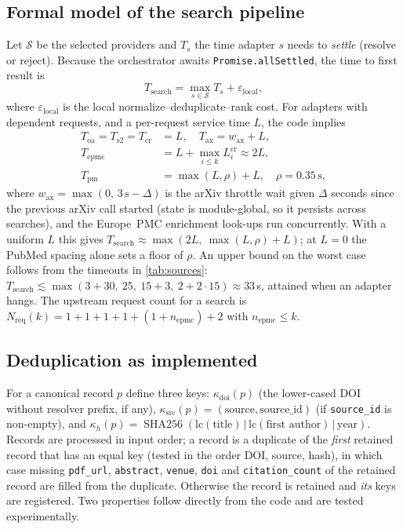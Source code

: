 \documentclass[conference]{IEEEtran}
\newcommand{\code}[1]{\texttt{\small #1}}
\begin{document}
\subsection{Formal model of the search pipeline}
Let $\mathcal S$ be the selected providers and $T_s$ the time adapter $s$ needs to \emph{settle} (resolve or reject). Because the orchestrator awaits \code{Promise.allSettled}, the time to first result is
\begin{equation}
T_{\text{search}} = \max_{s\in\mathcal S} T_s + \varepsilon_{\text{local}},
\label{eq:tsearch}
\end{equation}
where $\varepsilon_{\text{local}}$ is the local normalize--deduplicate--rank cost. For adapters with dependent requests, and a per-request service time $L$, the code implies
\begin{align}
T_{\text{oa}} = T_{\text{s2}} = T_{\text{cr}} &= L, \quad T_{\text{ax}} = w_{\text{ax}} + L, \nonumber\\
T_{\text{epmc}} &= L + \max_{i\le k} L^{\text{cr}}_i \approx 2L, \nonumber\\
T_{\text{pm}} &= \max(L,\rho) + L, \quad \rho = 0.35\,\text{s},
\label{eq:adapters}
\end{align}
where $w_{\text{ax}}=\max(0,\,3\,\text{s}-\Delta)$ is the arXiv throttle wait given $\Delta$ seconds since the previous arXiv call started (state is module-global, so it persists across searches), and the Europe~PMC enrichment look-ups run concurrently. With a uniform $L$ this gives $T_{\text{search}} \approx \max(2L,\ \max(L,\rho)+L)$; at $L{=}0$ the PubMed spacing alone sets a floor of $\rho$. An upper bound on the worst case follows from the timeouts in \cref{tab:sources}: $T_{\text{search}} \lesssim \max(3{+}30,\ 25,\ 15{+}3,\ 2{+}2{\cdot}15)\approx 33$\,s, attained when an adapter hangs. The upstream request count for a search is $N_{\text{req}}(k) = 1{+}1{+}1{+}1{+}(1{+}n_{\text{epmc}}){+}2$ with $n_{\text{epmc}}\le k$.

\subsection{Deduplication as implemented}
For a canonical record $p$ define three keys: $\kappa_{\text{doi}}(p)$ (the lower-cased DOI without resolver prefix, if any), $\kappa_{\text{src}}(p)=(\text{source},\text{source\_id})$ (if \code{source\_id} is non-empty), and $\kappa_{h}(p)=\operatorname{SHA256}(\text{lc}(\text{title})\,|\,\text{lc}(\text{first author})\,|\,\text{year})$. Records are processed in input order; a record is a duplicate of the \emph{first} retained record that has an equal key (tested in the order DOI, source, hash), in which case missing \code{pdf\_url}, \code{abstract}, \code{venue}, \code{doi} and \code{citation\_count} of the retained record are filled from the duplicate. Otherwise the record is retained and \emph{its} keys are registered. Two properties follow directly from the code and are tested experimentally.
\end{document}
